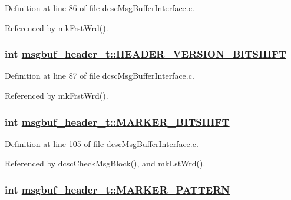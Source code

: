 Definition at line 86 of file dcsc\-Msg\-Buffer\-Interface.c.

Referenced by mk\-Frst\-Wrd().\hypertarget{structmsgbuf__header__t_0c67137e91ca9be67684094c75331f23}{
\subsubsection[HEADER\_\-VERSION\_\-BITSHIFT]{\setlength{\rightskip}{0pt plus 5cm}int \hyperlink{structmsgbuf__header__t_0c67137e91ca9be67684094c75331f23}{msgbuf\_\-header\_\-t::HEADER\_\-VERSION\_\-BITSHIFT}}}
\label{structmsgbuf__header__t_0c67137e91ca9be67684094c75331f23}




Definition at line 87 of file dcsc\-Msg\-Buffer\-Interface.c.

Referenced by mk\-Frst\-Wrd().\hypertarget{structmsgbuf__header__t_ab81b6d9c5dfd815ff59e798ee070b0e}{
\subsubsection[MARKER\_\-BITSHIFT]{\setlength{\rightskip}{0pt plus 5cm}int \hyperlink{structmsgbuf__header__t_ab81b6d9c5dfd815ff59e798ee070b0e}{msgbuf\_\-header\_\-t::MARKER\_\-BITSHIFT}}}
\label{structmsgbuf__header__t_ab81b6d9c5dfd815ff59e798ee070b0e}




Definition at line 105 of file dcsc\-Msg\-Buffer\-Interface.c.

Referenced by dcsc\-Check\-Msg\-Block(), and mk\-Lst\-Wrd().\hypertarget{structmsgbuf__header__t_4f6d9f143e2d0259908a2b7de3bac1b4}{
\subsubsection[MARKER\_\-PATTERN]{\setlength{\rightskip}{0pt plus 5cm}int \hyperlink{structmsgbuf__header__t_4f6d9f143e2d0259908a2b7de3bac1b4}{msgbuf\_\-header\_\-t::MARKER\_\-PATTERN}}}
\label{structmsgbuf__header__t_4f6d9f143e2d0259908a2b7de3bac1b4}




